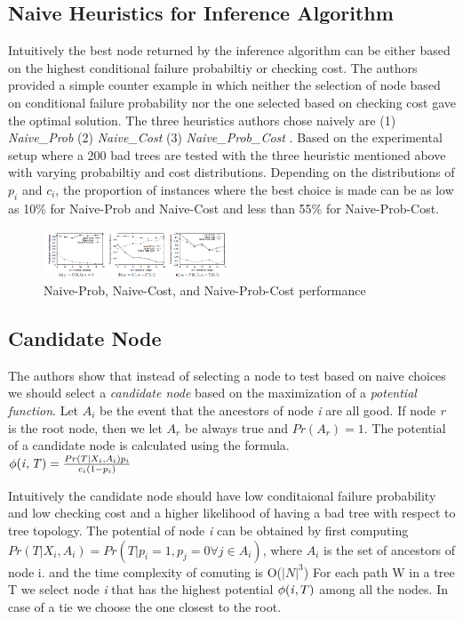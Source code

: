 \documentclass[10pt]{sigplan-proc-varsize}
\begin{document}
\subsection{Naive Heuristics for Inference Algorithm}
Intuitively the best node returned by the inference algorithm can be either based on the highest conditional failure probabiltiy or checking cost.  The authors provided a simple counter example in which neither the selection of node based on conditional failure probability nor the one selected based on checking cost gave the optimal solution. The three heuristics authors chose naively are (1) {\it Naive_Prob} (2) {\it Naive_Cost} (3) {\it Naive_Prob_Cost} . Based on the experimental setup where a 200 bad trees are tested with the three heuristic mentioned above with varying probabiltiy and cost distributions. Depending on the distributions of $p_i$ and $c_i$, the proportion of instances where the best choice is made can be as low as 10\% for Naive-Prob and Naive-Cost  and less than 55\% for Naive-Prob-Cost.
\begin{figure}[h!]
  \caption{Naive-Prob, Naive-Cost, and Naive-Prob-Cost performance}
  \centering
    \includegraphics[width=0.5\textwidth]{Fig11}
\end{figure}

\subsection{Candidate Node}
The authors show that instead of selecting a node to test based on naive choices we should select a {\it candidate node} based on the maximization of a {\it potential function}. Let $A_i$ be the event that the ancestors of node {\it i} are all good. If node {\it r} is the root node, then we let $A_r$ be always true and $Pr(A_r) = 1$. The potential of a candidate node is calculated using the formula. \\
                     $\phi({\it i,T)} = \frac{Pr(T|X_i,A_i)p_i}{c_i(1-p_i)}$

Intuitively the candidate node should have low conditaional failure probability and low checking cost and a higher likelihood of having a bad tree with respect to tree topology. The potential of node {\it i} can be obtained by first computing $Pr(T |X_i , A_i ) = Pr(T | p_i = 1, p_j = 0 \forall j \in A_i )$, where $A_i$ is the set of ancestors of node i. and the time complexity of comuting is O($|N|^3$) For each path W in a tree T we select node {\it i} that has the highest potential $\phi({\it i},T)$ among all the nodes. In case of a tie we choose the one closest to the root.
\end{document}
